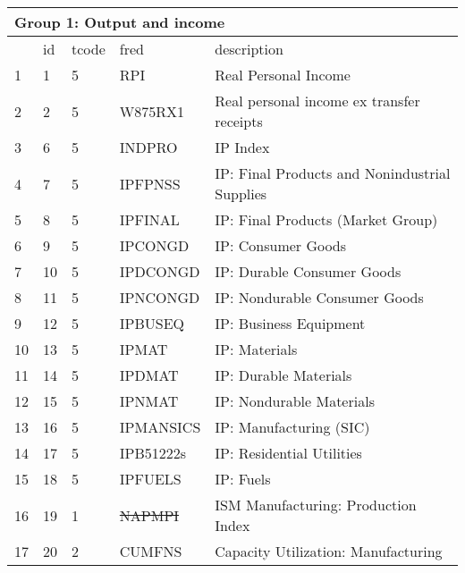 \begin{table}[ht] 
\centering 
\begin{tabular}{lllll} 
\multicolumn{5}{l}{Group 1: Output and income} \\
\toprule
 & id & tcode & fred & description \\
\midrule
1 & 1 & 5 & RPI & Real Personal Income \\
2 & 2 & 5 & W875RX1 & Real personal income ex transfer receipts \\
3 & 6 & 5 & INDPRO & IP Index \\
4 & 7 & 5 & IPFPNSS & IP: Final Products and Nonindustrial Supplies \\
5 & 8 & 5 & IPFINAL & IP: Final Products (Market Group) \\
6 & 9 & 5 & IPCONGD & IP: Consumer Goods \\
7 & 10 & 5 & IPDCONGD & IP: Durable Consumer Goods \\
8 & 11 & 5 & IPNCONGD & IP: Nondurable Consumer Goods \\
9 & 12 & 5 & IPBUSEQ & IP: Business Equipment \\
10 & 13 & 5 & IPMAT & IP: Materials \\
11 & 14 & 5 & IPDMAT & IP: Durable Materials \\
12 & 15 & 5 & IPNMAT & IP: Nondurable Materials \\
13 & 16 & 5 & IPMANSICS & IP: Manufacturing (SIC) \\
14 & 17 & 5 & IPB51222s & IP: Residential Utilities \\
15 & 18 & 5 & IPFUELS & IP: Fuels \\
16 & 19 & 1 & \sout{NAPMPI} & ISM Manufacturing: Production Index \\
17 & 20 & 2 & CUMFNS & Capacity Utilization: Manufacturing \\
\bottomrule
\end{tabular}  
\end{table} 